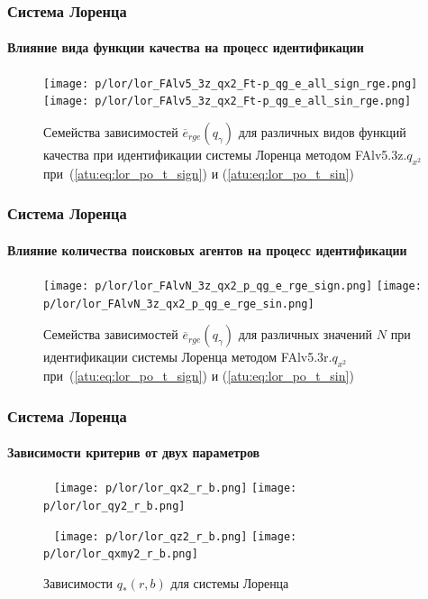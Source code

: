 \documentclass[10pt,utf8]{beamer}
\begin{document}
\begin{frame}
  \frametitle{Система Лоренца}
  \framesubtitle{Влияние вида функции качества на процесс идентификации}

  \begin{figure}[h!]
    \centerline{
      \texttt{[image: p/lor/lor\_FAlv5\_3z\_qx2\_Ft-p\_qg\_e\_all\_sign\_rge.png]}
      \hfill
      \texttt{[image: p/lor/lor\_FAlv5\_3z\_qx2\_Ft-p\_qg\_e\_all\_sin\_rge.png]}
    }
    \caption{Семейства зависимостей $\overline{e}_{rge}(q_\gamma)$ для различных видов функций качества при идентификации системы Лоренца методом FAlv5.3z.$q_{x^2}$
     при~(\ref{atu:eq:lor_po_t_sign}) и (\ref{atu:eq:lor_po_t_sin})}
    \label{atu:f:lor_ftype_rge}
  \end{figure}

\end{frame}



\begin{frame}
  \frametitle{Система Лоренца}
  \framesubtitle{Влияние количества поисковых агентов на процесс идентификации}


  \begin{figure}[h!]
    \centerline{
      \texttt{[image: p/lor/lor\_FAlvN\_3z\_qx2\_p\_qg\_e\_rge\_sign.png]}
      \hfill
      \texttt{[image: p/lor/lor\_FAlvN\_3z\_qx2\_p\_qg\_e\_rge\_sin.png]}
    }
    \caption{Семейства зависимостей $\overline{e}_{rge}(q_\gamma)$ для различных значений $N$ при идентификации системы Лоренца методом FAlv5.3r.$q_{x^2}$
     при~(\ref{atu:eq:lor_po_t_sign}) и (\ref{atu:eq:lor_po_t_sin})}
    \label{atu:f:lor_N_rge}
  \end{figure}


\end{frame}



\begin{frame}
  \frametitle{Система Лоренца}
  \framesubtitle{Зависимости критерив от двух параметров}


  \begin{figure}[h!]
    \centerline{
      {~}\hfill
      \texttt{[image: p/lor/lor\_qx2\_r\_b.png]}
      \hfill
      \texttt{[image: p/lor/lor\_qy2\_r\_b.png]}
      \hfill{~}
    }
    \centerline{
      {~}\hfill
      \texttt{[image: p/lor/lor\_qz2\_r\_b.png]}
      \hfill
      \texttt{[image: p/lor/lor\_qxmy2\_r\_b.png]}
      \hfill{~}
    }
    \caption{Зависимости $q_{*}(r,b)$ для системы Лоренца }
    \label{atu:f:lor_qrb}
  \end{figure}


\end{frame}
\end{document}
